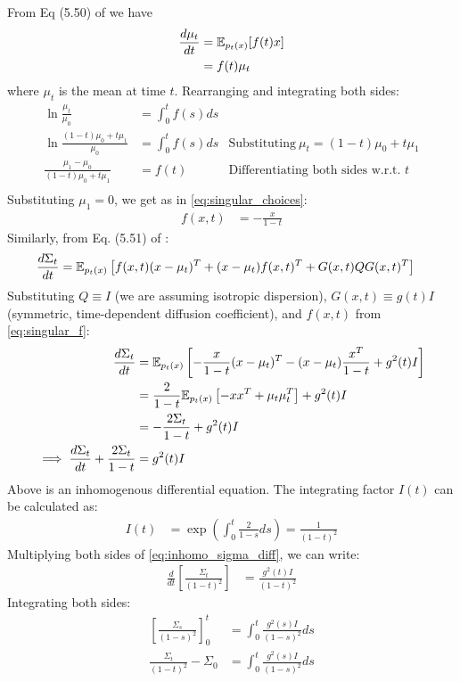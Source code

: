 From Eq (5.50) of \citet{sarkka2019applied} we have
\begin{align}
\frac{d\mu_t}{dt} &= \mathbb{E}_{p_t(x)} [f(t)x] \\
&= f(t)\mu_t
\end{align}
where $\mu_t$ is the mean at time $t$. Rearranging and integrating both sides:
\begin{align}
\ln \frac{\mu_t}{\mu_0} &= \int_0^t f(s)ds & \\
\ln \frac{(1-t)\mu_0+t\mu_1}{\mu_0} &= \int_0^t f(s)ds & \text{Substituting}~\mu_t = (1-t)\mu_0+t\mu_1\\
\frac{\mu_1 - \mu_0}{(1-t)\mu_0 + t\mu_1} &= f(t)  &\text{Differentiating both sides w.r.t. $t$}\\
\end{align}
Substituting $\mu_1=0$, we get as in \cref{eq:singular_choices}:
\begin{align}
\label{eq:singular_f}
f(x, t) &= -\frac{x}{1-t}
\end{align}
Similarly, from Eq. (5.51) of \citet{sarkka2019applied}:
\begin{align}
\frac{d\Sigma_t}{dt} &= \mathbb{E}_{p_t(x)}\left[f(x,t)(x-\mu_t)^T + (x - \mu_t)f(x, t)^T + G(x, t)QG(x, t)^T\right]
\end{align}
Substituting $Q \equiv I$ (we are assuming isotropic dispersion), $G(x, t) \equiv g(t)I$ (symmetric, time-dependent diffusion coefficient), and $f(x,t)$ from \cref{eq:singular_f}:
\begin{align}
\frac{d\Sigma_t}{dt} &= \mathbb{E}_{p_t(x)}\left[-\frac{x}{1-t}(x-\mu_t)^T - (x - \mu_t)\frac{x^T}{1-t} + g^2(t)I\right] \\
&= \frac{2}{1-t}\mathbb{E}_{p_t(x)}\left[-xx^T + \mu_t\mu_t^T\right] + g^2(t)I \\
&= -\frac{2\Sigma_t}{1-t} + g^2(t)I \\
\label{eq:inhomo_sigma_diff}
\implies \frac{d\Sigma_t}{dt} + \frac{2\Sigma_t}{1-t} &= g^2(t)I
\end{align}
Above is an inhomogenous differential equation.
The integrating factor $I(t)$ can be calculated as:
\begin{align}
I(t) &= \exp \left(\int_0^t \frac{2}{1-s}ds \right) = \frac{1}{(1-t)^2}
\end{align}
Multiplying both sides of \cref{eq:inhomo_sigma_diff}, we can write:
\begin{align}
\frac{d}{dt}\left[ \frac{\Sigma_t}{(1-t)^2} \right] &= \frac{g^2(t)I}{(1-t)^2}
\end{align}
Integrating both sides:
\begin{align}
\left[ \frac{\Sigma_s}{(1-s)^2} \right]_0^t &= \int_0^t\frac{g^2(s)I}{(1-s)^2}ds \\
\frac{\Sigma_t}{(1-t)^2} - \Sigma_0 &= \int_0^t\frac{g^2(s)I}{(1-s)^2}ds
\end{align}
